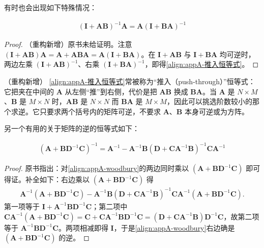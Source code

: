 \documentclass[../main.tex]{subfiles}
\begin{document}
有时也会出现如下特殊情况：
\begin{proposition}[推入恒等式]\label{proposition:appA-推入恒等式}
\begin{align}
  (\bm{I}+\bm{A}\bm{B})^{-1}\bm{A}=\bm{A}(\bm{I}+\bm{B}\bm{A})^{-1}
  \label{align:appA-推入恒等式}
\end{align}
\end{proposition}

\begin{proof}
（重构新增）原书未给证明。注意 $(\bm{I}+\bm{A}\bm{B})\bm{A}=\bm{A}+\bm{A}\bm{B}\bm{A}=\bm{A}(\bm{I}+\bm{B}\bm{A})$。在 $\bm{I}+\bm{A}\bm{B}$ 与 $\bm{I}+\bm{B}\bm{A}$ 均可逆时，两边左乘 $(\bm{I}+\bm{A}\bm{B})^{-1}$、右乘 $(\bm{I}+\bm{B}\bm{A})^{-1}$，即得\eqref{align:appA-推入恒等式}。
\end{proof}

\begin{remark}（重构新增）
\eqref{align:appA-推入恒等式}常被称为“推入（push-through）”恒等式：它把夹在中间的 $\bm{A}$ 从左侧“推”到右侧，代价是把 $\bm{A}\bm{B}$ 换成 $\bm{B}\bm{A}$。当 $\bm{A}$ 是 $N\times M$、$\bm{B}$ 是 $M\times N$ 时，$\bm{A}\bm{B}$ 是 $N\times N$ 而 $\bm{B}\bm{A}$ 是 $M\times M$，因此可以挑选阶数较小的那个求逆。它只要求两个括号内的矩阵可逆，不要求 $\bm{A}$、$\bm{B}$ 本身可逆或为方阵。
\end{remark}

另一个有用的关于矩阵的逆的恒等式如下：
\begin{proposition}\label{proposition:appA-woodbury}
\begin{align}
  (\bm{A}+\bm{B}\bm{D}^{-1}\bm{C})^{-1}=\bm{A}^{-1}-\bm{A}^{-1}\bm{B}(\bm{D}+\bm{C}\bm{A}^{-1}\bm{B})^{-1}\bm{C}\bm{A}^{-1}
  \label{align:appA-woodbury}
\end{align}
\end{proposition}

\begin{proof}
原书指出：对\eqref{align:appA-woodbury}的两边同时乘以 $(\bm{A}+\bm{B}\bm{D}^{-1}\bm{C})$ 即可得证。补全如下：右边乘以 $(\bm{A}+\bm{B}\bm{D}^{-1}\bm{C})$ 得
\begin{align*}
  \bm{A}^{-1}(\bm{A}+\bm{B}\bm{D}^{-1}\bm{C})-\bm{A}^{-1}\bm{B}(\bm{D}+\bm{C}\bm{A}^{-1}\bm{B})^{-1}\bm{C}\bm{A}^{-1}(\bm{A}+\bm{B}\bm{D}^{-1}\bm{C}).
\end{align*}
第一项等于 $\bm{I}+\bm{A}^{-1}\bm{B}\bm{D}^{-1}\bm{C}$；第二项中 $\bm{C}\bm{A}^{-1}(\bm{A}+\bm{B}\bm{D}^{-1}\bm{C})=\bm{C}+\bm{C}\bm{A}^{-1}\bm{B}\bm{D}^{-1}\bm{C}=(\bm{D}+\bm{C}\bm{A}^{-1}\bm{B})\bm{D}^{-1}\bm{C}$，故第二项等于 $\bm{A}^{-1}\bm{B}\bm{D}^{-1}\bm{C}$。两项相减即得 $\bm{I}$，于是\eqref{align:appA-woodbury}右边确是 $(\bm{A}+\bm{B}\bm{D}^{-1}\bm{C})$ 的逆。
\end{proof}
\end{document}
